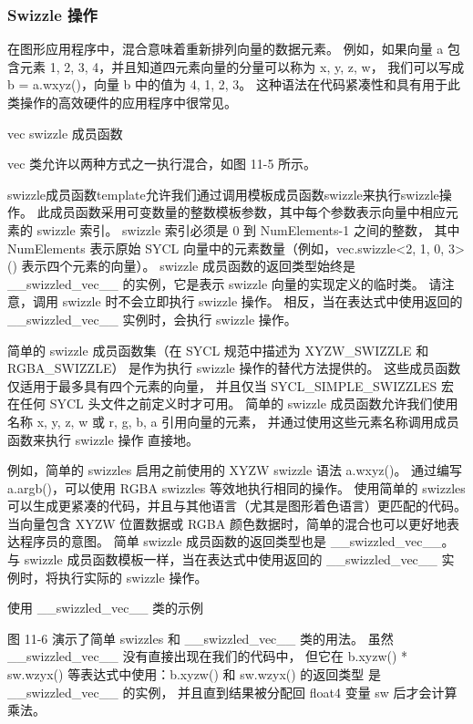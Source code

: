 \subsubsection{Swizzle 操作}
在图形应用程序中，混合意味着重新排列向量的数据元素。 
例如，如果向量 a 包含元素 {1, 2, 3, 4}，并且知道四元素向量的分量可以称为 {x, y, z, w}，
我们可以写成 b = a.wxyz()，向量 b 中的值为 {4, 1, 2, 3}。 
这种语法在代码紧凑性和具有用于此类操作的高效硬件的应用程序中很常见。

{\color{red} vec swizzle 成员函数}

vec 类允许以两种方式之一执行混合，如图 11-5 所示。

swizzle成员函数template允许我们通过调用模板成员函数swizzle来执行swizzle操作。 
此成员函数采用可变数量的整数模板参数，其中每个参数表示向量中相应元素的 swizzle 索引。 
swizzle 索引必须是 0 到 NumElements-1 之间的整数，
其中 NumElements 表示原始 SYCL 向量中的元素数量（例如，vec.swizzle<2, 1, 0, 3>() 表示四个元素的向量）。 
swizzle 成员函数的返回类型始终是 \_\_swizzled\_vec\_\_ 的实例，它是表示 swizzle 向量的实现定义的临时类。 
请注意，调用 swizzle 时不会立即执行 swizzle 操作。 
相反，当在表达式中使用返回的 \_\_swizzled\_vec\_\_ 实例时，会执行 swizzle 操作。

简单的 swizzle 成员函数集（在 SYCL 规范中描述为 XYZW\_SWIZZLE 和 RGBA\_SWIZZLE）
是作为执行 swizzle 操作的替代方法提供的。 这些成员函数仅适用于最多具有四个元素的向量，
并且仅当 SYCL\_SIMPLE\_SWIZZLES 宏在任何 SYCL 头文件之前定义时才可用。 
简单的 swizzle 成员函数允许我们使用名称 {x, y, z, w} 或 {r, g, b, a} 引用向量的元素，
并通过使用这些元素名称调用成员函数来执行 swizzle 操作 直接地。

例如，简单的 swizzles 启用之前使用的 XYZW swizzle 语法 a.wxyz()。 
通过编写 a.argb()，可以使用 RGBA swizzles 等效地执行相同的操作。 
使用简单的 swizzles 可以生成更紧凑的代码，并且与其他语言（尤其是图形着色语言）更匹配的代码。 
当向量包含 XYZW 位置数据或 RGBA 颜色数据时，简单的混合也可以更好地表达程序员的意图。 
简单 swizzle 成员函数的返回类型也是 \_\_swizzled\_vec\_\_。 
与 swizzle 成员函数模板一样，当在表达式中使用返回的 \_\_swizzled\_vec\_\_ 实例时，将执行实际的 swizzle 操作。

{\color{red} 使用 \_\_swizzled\_vec\_\_ 类的示例}

图 11-6 演示了简单 swizzles 和 \_\_swizzled\_vec\_\_ 类的用法。 
虽然 \_\_swizzled\_vec\_\_ 没有直接出现在我们的代码中，
但它在 b.xyzw() * sw.wzyx() 等表达式中使用：b.xyzw() 和 sw.wzyx() 的返回类型
是 \_\_swizzled\_vec\_\_ 的实例， 并且直到结果被分配回 float4 变量 sw 后才会计算乘法。

